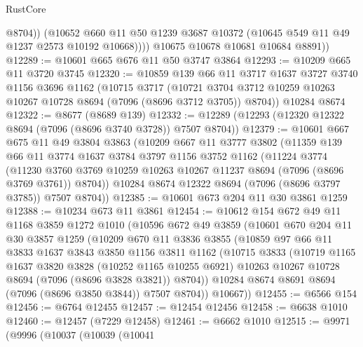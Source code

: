 \begin{lexlean}{RustCore}
\begin{coremodule}
                @8704))
            (@10652
              @660
              @11
              @50
              @1239
              @3687
              @10372
              (@10645 @549 @11 @49 @1237 @2573 @10192 @10668))))
        @10675
        @10678
        @10681
        @10684
        @8891))
@12289 := @10601 @665 @676 @11 @50 @3747 @3864
@12293 := @10209 @665 @11 @3720 @3745
@12320 := @10859
    @139
    @66
    @11
    @3717
    @1637
    @3727
    @3740
    @1156
    @3696
    @1162
    (@10715
      @3717
      (@10721 @3704 @3712 @10259 @10263 @10267 @10728 @8694 (@7096 (@8696 @3712 @3705)) @8704))
    @10284
    @8674
@12322 := @8677 (@8689 @139)
@12332 := @12289 (@12293 (@12320 @12322 @8694 (@7096 (@8696 @3740 @3728)) @7507 @8704))
@12379 := @10601
    @667
    @675
    @11
    @49
    @3804
    @3863
    (@10209
      @667
      @11
      @3777
      @3802
      (@11359
        @139
        @66
        @11
        @3774
        @1637
        @3784
        @3797
        @1156
        @3752
        @1162
        (@11224
          @3774
          (@11230 @3760 @3769 @10259 @10263 @10267 @11237 @8694 (@7096 (@8696 @3769 @3761)) @8704))
        @10284
        @8674
        @12322
        @8694
        (@7096 (@8696 @3797 @3785))
        @7507
        @8704))
@12385 := @10601 @673 @204 @11 @30 @3861 @1259
@12388 := @10234 @673 @11 @3861
@12454 := @10612
    @154
    @672
    @49
    @11
    @1168
    @3859
    @1272
    @1010
    (@10596
      @672
      @49
      @3859
      (@10601
        @670
        @204
        @11
        @30
        @3857
        @1259
        (@10209
          @670
          @11
          @3836
          @3855
          (@10859
            @97
            @66
            @11
            @3833
            @1637
            @3843
            @3850
            @1156
            @3811
            @1162
            (@10715
              @3833
              (@10719
                @1165
                @1637
                @3820
                @3828
                (@10252 @1165 @10255 @6921)
                @10263
                @10267
                @10728
                @8694
                (@7096 (@8696 @3828 @3821))
                @8704))
            @10284
            @8674
            @8691
            @8694
            (@7096 (@8696 @3850 @3844))
            @7507
            @8704))
        @10667))
@12455 := @6566 @154
@12456 := @6764 @12455
@12457 := @12454 @12456
@12458 := @6638 @1010
@12460 := @12457 (@7229 @12458)
@12461 := @6662 @1010
@12515 := @9971
    (@9996
      (@10037
        (@10039
          (@10041

\end{coremodule}
\end{lexlean}
